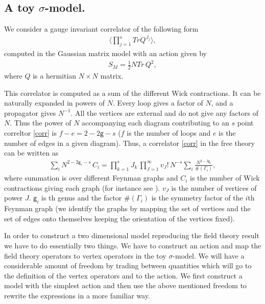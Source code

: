 \documentclass[11pt]{JHEP3}
\def\be{\begin{eqnarray}}
\def\ee{\end{eqnarray}}
\def\s{\sigma}
\def\half{\frac{1}{2}}
\def\s{\sigma}
\def\gg{\mathsf g }
\begin{document}
\subsection{A toy $\s$-model.}\label{toy1}

We consider a gauge invariant correlator of the following form
\be\label{corr}
\langle\prod_{j=1}^sTrQ^{J_j}\rangle,
\ee computed in the Gaussian matrix model with an action given by
\be\label{Maction}
S_M=\half N Tr\,Q^2,
\ee where $Q$ is a hermitian $N\times N$ matrix.


 This correlator is computed as a sum of the different Wick contractions. It can be naturally expanded in powers of $N$.
 Every loop gives a factor of $N$,  and a propagator gives $N^{-1}$. All the  vertices  are external 
 and do not give any factors of $N$. Thus the power of $N$ accompanying  each diagram contributing to an $s$ point correltor \eqref{corr} is  $f-e=2-2\gg-s$ ($f$ is the number of loops and $e$ is the number of edges in a given diagram).  Thus, a   correlator \eqref{corr} in the free theory can be written as
\be\label{prefactor}
\sum_{i} N^{2-2\gg_i-s}\,C_i= \prod_{k=1}^s J_k\,\prod_{J=1}^\infty v_J!\,N^{-s}\sum_i \frac{N^{2-2\gg_i}}{\#(\Gamma_i)},
\ee
 where summation is over different Feynman graphs and $C_i$ is the number of Wick contractions giving each graph (for instance see \cite{Penner}). 
 $v_J$ is the number of vertices of power $J$. $\gg_i$ is th genus and the factor $\#(\Gamma_i)$ is the symmetry factor of
the $i$th Feynman graph (we identify the graphs by mapping the set of vertices and the set of edges onto themselves keeping the orientation of the vertices fixed). 

\medskip
In order to construct a two dimensional  model reproducing the field theory
result we have to do essentially two things. We have to construct an action and map the field theory operators to vertex operators in the  toy $\sigma$-model. We will have a considerable amount of freedom by trading between quantities which will go to the definition
of the vertex operators and to the action. We first construct a model with the simplest
action and then use the above mentioned freedom to rewrite the expressions in a more familiar way. 
\end{document}

